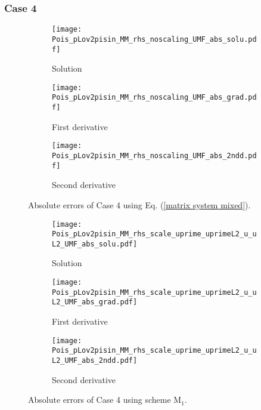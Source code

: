 \documentclass[final,3p]{elsarticle}
\begin{document}
\subsubsection{Case 4}

\begin{figure}[!ht]
    \begin{subfigure}{5.5cm}
        \texttt{[image: Pois\_pLov2pisin\_MM\_rhs\_noscaling\_UMF\_abs\_solu.pdf]}
        \caption{Solution}
        \label{Fig:Pois_pLov2pisin_MM_rhs_noscaling_UMF_abs_solu}
    \end{subfigure}
    \begin{subfigure}{5.5cm}
        \texttt{[image: Pois\_pLov2pisin\_MM\_rhs\_noscaling\_UMF\_abs\_grad.pdf]}
        \caption{First derivative}
        \label{Fig:Pois_pLov2pisin_MM_rhs_noscaling_UMF_abs_grad}
    \end{subfigure}
    \begin{subfigure}{5.5cm}
        \texttt{[image: Pois\_pLov2pisin\_MM\_rhs\_noscaling\_UMF\_abs\_2ndd.pdf]}
        \caption{Second derivative}
        \label{Fig:Pois_pLov2pisin_MM_rhs_noscaling_UMF_abs_2ndd}
    \end{subfigure}
\caption{Absolute errors of Case 4 using Eq. (\ref{matrix system mixed}).}
\label{Pois_pLov2pisin_MM_rhs_noscaling_UMF_abs}
\end{figure}

\begin{figure}[!ht]
    \begin{subfigure}{5.5cm}
        \texttt{[image: Pois\_pLov2pisin\_MM\_rhs\_scale\_uprime\_uprimeL2\_u\_uL2\_UMF\_abs\_solu.pdf]}
        \caption{Solution}
        \label{Fig:Pois_pLov2pisin_MM_rhs_scale_uprime_uprimeL2_u_uL2_UMF_abs_solu}
    \end{subfigure}
    \begin{subfigure}{5.5cm}
        \texttt{[image: Pois\_pLov2pisin\_MM\_rhs\_scale\_uprime\_uprimeL2\_u\_uL2\_UMF\_abs\_grad.pdf]}
        \caption{First derivative}
        \label{Fig:Pois_pLov2pisin_MM_rhs_scale_uprime_uprimeL2_u_uL2_UMF_abs_grad}
    \end{subfigure}
    \begin{subfigure}{5.5cm}
        \texttt{[image: Pois\_pLov2pisin\_MM\_rhs\_scale\_uprime\_uprimeL2\_u\_uL2\_UMF\_abs\_2ndd.pdf]}
        \caption{Second derivative}
        \label{Fig:Pois_pLov2pisin_MM_rhs_scale_uprime_uprimeL2_u_uL2_UMF_abs_2ndd}
    \end{subfigure}
\caption{Absolute errors of Case 4 using scheme $\text{M}_1$.}
\label{Pois_pLov2pisin_MM_rhs_scale_uprime_uprimeL2_u_uL2_UMF_abs}
\end{figure}
\end{document}
